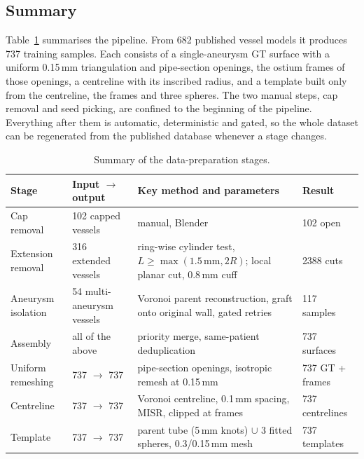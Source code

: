 \subsection{Summary}
\label{sec:dp_summary}

Table~\ref{tab:dp_summary} summarises the pipeline. From 682 published vessel models it produces 737 training samples. Each consists of a single-aneurysm GT surface with a uniform 0.15\,mm triangulation and pipe-section openings, the ostium frames of those openings, a centreline with its inscribed radius, and a template built only from the centreline, the frames and three spheres. The two manual steps, cap removal and seed picking, are confined to the beginning of the pipeline. Everything after them is automatic, deterministic and gated, so the whole dataset can be regenerated from the published database whenever a stage changes.

\begin{table}[H]
    \centering
    \footnotesize
    \caption{Summary of the data-preparation stages.}
    \label{tab:dp_summary}
    \renewcommand{\arraystretch}{1.25}
    \begin{tabular}{p{3.0cm} p{3.6cm} p{4.6cm} p{2.6cm}}
        \hline
        \textbf{Stage} & \textbf{Input $\rightarrow$ output} & \textbf{Key method and parameters} & \textbf{Result} \\
        \hline
        Cap removal & 102 capped vessels & manual, Blender & 102 open \\
        Extension removal & 316 extended vessels & ring-wise cylinder test, $L \ge \max(1.5\,\text{mm}, 2R)$; local planar cut, $0.8$\,mm cuff & 2388 cuts \\
        Aneurysm isolation & 54 multi-aneurysm vessels & Voronoi parent reconstruction, graft onto original wall, gated retries & 117 samples \\
        Assembly & all of the above & priority merge, same-patient deduplication & 737 surfaces \\
        Uniform remeshing & 737 $\rightarrow$ 737 & pipe-section openings, isotropic remesh at 0.15\,mm & 737 GT + frames \\
        Centreline & 737 $\rightarrow$ 737 & Voronoi centreline, 0.1\,mm spacing, MISR, clipped at frames & 737 centrelines \\
        Template & 737 $\rightarrow$ 737 & parent tube (5\,mm knots) $\cup$ 3 fitted spheres, 0.3/0.15\,mm mesh & 737 templates \\
        \hline
    \end{tabular}
\end{table}
